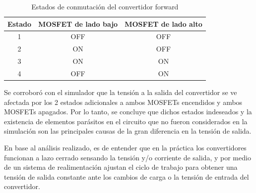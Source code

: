 \begin{table}[H]
    \centering
    \begin{tabular}{ccc}
    \hline
    Estado & MOSFET de lado bajo & MOSFET de lado alto \\ \hline
    1      & OFF                 & OFF                 \\
    2      & ON                  & OFF                 \\
    3      & ON                  & ON                  \\
    4      & OFF                 & ON                  \\ \hline
    \end{tabular}
    \caption{Estados de conmutación del convertidor forward}
    \label{tab:estados}
\end{table}

Se corroboró con el simulador que la tensión a la salida del convertidor se ve afectada por los 2 estados adicionales a ambos MOSFETs encendidos y ambos MOSFETs apagados. Por lo tanto, se concluye que dichos estados indeseados y la existencia de elementos parásitos en el circuito que no fueron considerados en la simulación son las principales causas de la gran diferencia en la tensión de salida.  

En base al análisis realizado, es de entender que en la práctica los convertidores funcionan a lazo cerrado sensando la tensión y/o corriente de salida, y por medio de un sistema de realimentación ajustan el ciclo de trabajo para obtener una tensión de salida constante ante los cambios de carga o la tensión de entrada del convertidor.